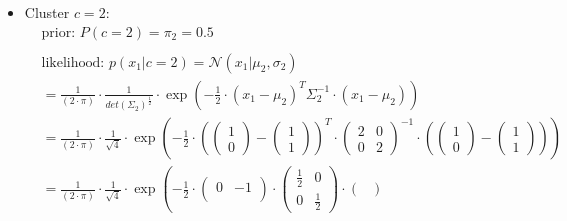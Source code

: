 \documentclass[12pt]{article}
\begin{document}
\begin{enumerate}
\begin{itemize}[label=]
            \item Cluster $c=2$:
            \begin{equation*}
                \begin{aligned}
                    &\text{prior: } P(c=2) = \pi_2 = \mathbf{0.5} \\
                    \\
                    &\text{likelihood: } p(x_1|c=2) = \mathcal{N}(x_1| \mu_2, \sigma_2) \\
                    &= \frac{1}{(2 \cdot \pi)} \cdot \frac{1}{det(\Sigma_2)^\frac{1}{2}} \cdot \exp \left( -\frac{1}{2} \cdot (x_1 - \mu_2)^{T} \Sigma_2^{-1} \cdot (x_1 - \mu_2) \right)\\
                    &= \frac{1}{(2 \cdot \pi)} \cdot \frac{1}{\sqrt{4}} \cdot \exp \left( -\frac{1}{2} \cdot \left(\begin{pmatrix}
                    1\\
                    0
                    \end{pmatrix} - \begin{pmatrix}
                    1\\
                    1
                    \end{pmatrix}\right)^{T} \cdot \begin{pmatrix}
                    2 & 0\\
                    0 & 2
                    \end{pmatrix}^{-1} \cdot \left(\begin{pmatrix}
                    1\\
                    0
                    \end{pmatrix} - \begin{pmatrix}
                    1\\
                    1
                    \end{pmatrix}\right) \right)\\
                    &= \frac{1}{(2 \cdot \pi)} \cdot \frac{1}{\sqrt{4}} \cdot \exp \left( -\frac{1}{2} \cdot \begin{pmatrix}
                    0 & -1\\
                    \end{pmatrix} \cdot \begin{pmatrix}
                    \frac{1}{2} & 0\\
                    0 & \frac{1}{2}
                    \end{pmatrix} \cdot \begin{pmatrix}

\end{pmatrix}
\end{aligned}
\end{equation*}
\end{itemize}
\end{enumerate}
\end{document}
